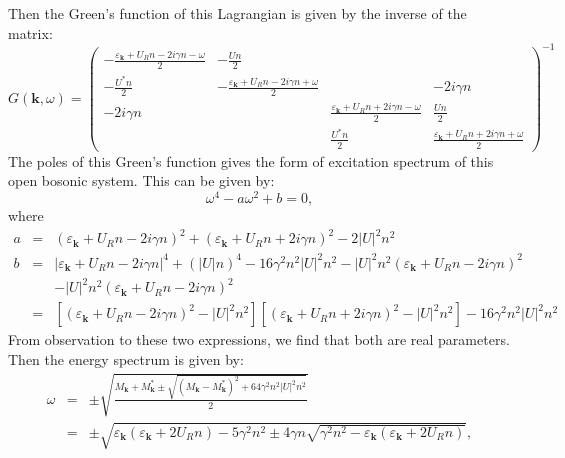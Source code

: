 \documentclass{article}
\newcommand{\tmmathbf}[1]{\ensuremath{\boldsymbol{#1}}}
\begin{document}
Then the Green's function of this Lagrangian is given by the inverse of the
matrix:
\begin{equation}
  G (\tmmathbf{k}, \omega) = \left(\begin{array}{cccc}
    - \frac{\varepsilon_{\tmmathbf{k}} + U_R n - 2 i \gamma n - \omega}{2} & -
    \frac{U n}{2} &  & \\
    - \frac{U^{\ast} n}{2} & - \frac{\varepsilon_{\tmmathbf{k}} + U_R n - 2 i
    \gamma n + \omega}{2} &  & - 2 i \gamma n\\
    - 2 i \gamma n &  & \frac{\varepsilon_{\tmmathbf{k}} + U_R n + 2 i \gamma
    n - \omega}{2} & \frac{U n}{2}\\
    &  & \frac{U^{\ast} n}{2} & \frac{\varepsilon_{\tmmathbf{k}} + U_R n + 2
    i \gamma n + \omega}{2}
  \end{array}\right)^{- 1}
\end{equation}
The poles of this Green's function gives the form of excitation spectrum of
this open bosonic system. This can be given by:
\begin{equation}
  \omega^4 - a \omega^2 + b = 0,
\end{equation}
where
\begin{eqnarray}
  a & = & (\varepsilon_{\tmmathbf{k}} + U_R n - 2 i \gamma n)^2 +
  (\varepsilon_{\tmmathbf{k}} + U_R n + 2 i \gamma n)^2 - 2 | U |^2 n^2 \\
  b & = & | \varepsilon_{\tmmathbf{k}} + U_R n - 2 i \gamma n |^4 + (| U |
  n)^4 - 16 \gamma^2 n^2 | U |^2 n^2 - | U |^2 n^2 (\varepsilon_{\tmmathbf{k}}
  + U_R n - 2 i \gamma n)^2 \nonumber\\
  &  & - | U |^2 n^2 (\varepsilon_{\tmmathbf{k}} + U_R n - 2 i \gamma n)^2
  \nonumber\\
  & = & [(\varepsilon_{\tmmathbf{k}} + U_R n - 2 i \gamma n)^2 - | U |^2 n^2]
  [(\varepsilon_{\tmmathbf{k}} + U_R n + 2 i \gamma n)^2 - | U |^2 n^2] - 16
  \gamma^2 n^2 | U |^2 n^2 
\end{eqnarray}
From observation to these two expressions, we find that both are real
parameters. Then the energy spectrum is given by:
\begin{eqnarray}
  \omega & = & \pm \sqrt{\frac{M_{\tmmathbf{k}} + M_{\tmmathbf{k}}^{\ast} \pm
  \sqrt{(M_{\tmmathbf{k}} - M_{\tmmathbf{k}}^{\ast})^2 + 64 \gamma^2 n^2 | U
  |^2 n^2}}{2}} \nonumber\\
  & = & \pm \sqrt{\varepsilon_{\tmmathbf{k}} (\varepsilon_{\tmmathbf{k}} + 2
  U_R n) - 5 \gamma^2 n^2 \pm 4 \gamma n \sqrt{\gamma^2 n^2 -
  \varepsilon_{\tmmathbf{k}} (\varepsilon_{\tmmathbf{k}} + 2 U_R n)}},
\end{eqnarray}
\end{document}
